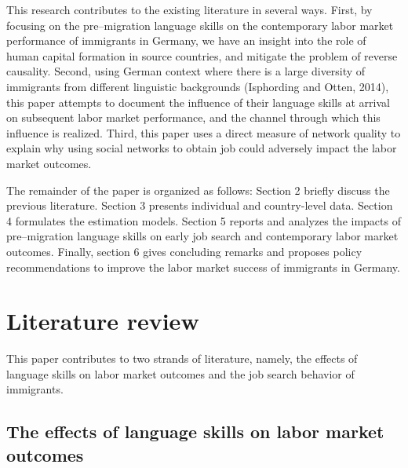 \documentclass[12pt,a4paper]{article}
\begin{document}
This research contributes to the existing literature in several ways. First, by focusing on the pre--migration language skills on the contemporary labor market performance of immigrants in Germany, we have an insight into the role of human capital formation in source countries, and mitigate the problem of reverse causality. Second, using German context where there is a large diversity of immigrants from different linguistic backgrounds (Isphording and Otten, 2014), this paper attempts to document the influence of their language skills at arrival on subsequent labor market performance, and the channel through which this influence is realized. Third, this paper uses a direct measure of network quality to explain why using social networks to obtain job could adversely impact the labor market outcomes.

The remainder of the paper is organized as follows: Section 2 briefly discuss the previous literature. Section 3 presents individual and country-level data. Section 4 formulates the estimation models. Section 5 reports and analyzes the impacts of pre--migration language skills on early job search and contemporary labor market outcomes. Finally, section 6 gives concluding remarks and proposes policy recommendations to improve the labor market success of immigrants in Germany.

\section{Literature review}

This paper contributes to two strands of literature, namely, the effects of language skills on labor market outcomes and the job search behavior of immigrants.

\subsection{The effects of language skills on labor market outcomes}
\end{document}

